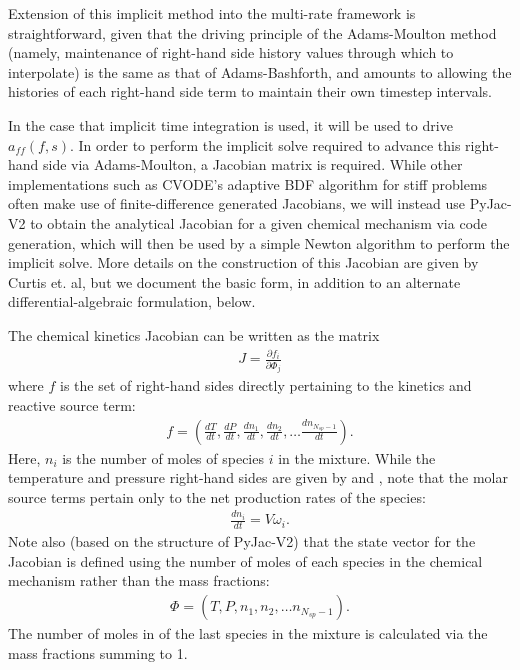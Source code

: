 Extension of this implicit method into the multi-rate framework is
straightforward, given that the driving principle of the Adams-Moulton
method (namely, maintenance of right-hand side history values through
which to interpolate) is the same as that of Adams-Bashforth, and amounts to
allowing the histories of each right-hand side term to maintain their
own timestep intervals.

In the case that implicit time integration is used, it will be used
to drive $a_{ff}(f,s)$. In order to perform the implicit solve required
to advance this right-hand side via Adams-Moulton, a Jacobian matrix
is required. While other implementations such as CVODE's adaptive BDF
algorithm for stiff problems often make use of finite-difference generated
Jacobians, we will instead use PyJac-V2 \cite{curtis2018using} to obtain the analytical Jacobian
for a given chemical mechanism via code generation, which will then
be used by a simple Newton algorithm to perform the implicit solve. More
details on the construction of this Jacobian are given by Curtis et. al, but we
document the basic form, in addition to an alternate differential-algebraic
formulation, below.

The chemical kinetics Jacobian can be written as the matrix
\begin{align}
J = \frac{\partial f_{i}}{\partial \Phi_{j}} \label{eq:jac}
\end{align}
where $f$ is the set of right-hand sides directly pertaining
to the kinetics and reactive source term:
\begin{align}
f = \left(\frac{dT}{dt}, \frac{dP}{dt}, \frac{dn_{1}}{dt}, \frac{dn_{2}}{dt}, \hdots \frac{dn_{N_{sp}-1}}{dt} \right).
\end{align}
Here, $n_{i}$ is the number of moles of species $i$ in the mixture.
While the temperature and pressure right-hand sides are given by  and ,
note that the molar source terms pertain only to the net production rates of the species:
\begin{align}
\frac{dn_{i}}{dt} = V \dot{\omega}_{i}.
\end{align}
Note also (based on the structure of PyJac-V2) that the state vector for the
Jacobian is defined using the number of moles of each species in the chemical
mechanism rather than the mass fractions:
\begin{align}
\Phi = \left(T, P, n_{1}, n_{2}, \hdots n_{N_{sp}-1}\right).
\end{align}
The number of moles in of the last species in the mixture is calculated
via the mass fractions summing to 1.

